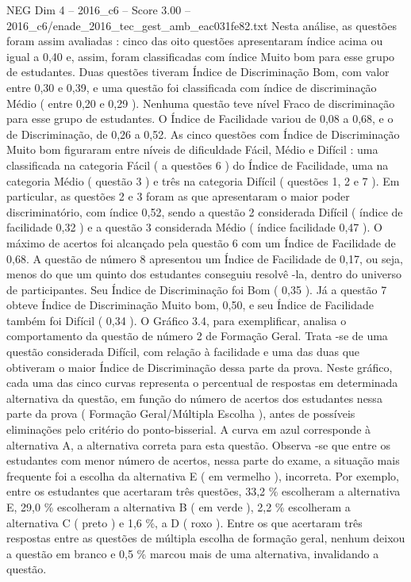\begin{textsample}{NEG Dim 4 – 2016\_c6 – Score 3.00 – 2016\_c6/enade\_2016\_tec\_gest\_amb\_eac031fe82.txt}
Nesta análise, as questões foram assim avaliadas : cinco das oito questões apresentaram índice acima ou igual a 0,40 e, assim, foram classificadas com índice Muito bom para esse grupo de estudantes.
Duas questões tiveram Índice de Discriminação Bom, com valor entre 0,30 e 0,39, e uma questão foi classificada com índice de discriminação Médio ( entre 0,20 e 0,29 ).
Nenhuma questão teve nível Fraco de discriminação para esse grupo de estudantes.
O Índice de Facilidade variou de 0,08 a 0,68, e o de Discriminação, de 0,26 a 0,52.
As cinco questões com Índice de Discriminação Muito bom figuraram entre níveis de dificuldade Fácil, Médio e Difícil : uma classificada na categoria Fácil ( a questões 6 ) do Índice de Facilidade, uma na categoria Médio ( questão 3 ) e três na categoria Difícil ( questões 1, 2 e 7 ).
Em particular, as questões 2 e 3 foram as que apresentaram o maior poder discriminatório, com índice 0,52, sendo a questão 2 considerada Difícil ( índice de facilidade 0,32 ) e a questão 3 considerada Médio ( índice facilidade 0,47 ).
O máximo de acertos foi alcançado pela questão 6 com um Índice de Facilidade de 0,68.
A questão de número 8 apresentou um Índice de Facilidade de 0,17, ou seja, menos do que um quinto dos estudantes conseguiu resolvê -la, dentro do universo de participantes.
Seu Índice de Discriminação foi Bom ( 0,35 ).
Já a questão 7 obteve Índice de Discriminação Muito bom, 0,50, e seu Índice de Facilidade também foi Difícil ( 0,34 ).
O Gráfico 3.4, para exemplificar, analisa o comportamento da questão de número 2 de Formação Geral.
Trata -se de uma questão considerada Difícil, com relação à facilidade e uma das duas que obtiveram o maior Índice de Discriminação dessa parte da prova.
Neste gráfico, cada uma das cinco curvas representa o percentual de respostas em determinada alternativa da questão, em função do número de acertos dos estudantes nessa parte da prova ( Formação Geral/Múltipla Escolha ), antes de possíveis eliminações pelo critério do ponto-bisserial.
A curva em azul corresponde à alternativa A, a alternativa correta para esta questão.
Observa -se que entre os estudantes com menor número de acertos, nessa parte do exame, a situação mais frequente foi a escolha da alternativa E ( em vermelho ), incorreta.
Por exemplo, entre os estudantes que acertaram três questões, 33,2 \% escolheram a alternativa E, 29,0 \% escolheram a alternativa B ( em verde ), 2,2 \% escolheram a alternativa C ( preto ) e 1,6 \%, a D ( roxo ).
Entre os que acertaram três respostas entre as questões de múltipla escolha de formação geral, nenhum deixou a questão em branco e 0,5 \% marcou mais de uma alternativa, invalidando a questão.

\end{textsample}
